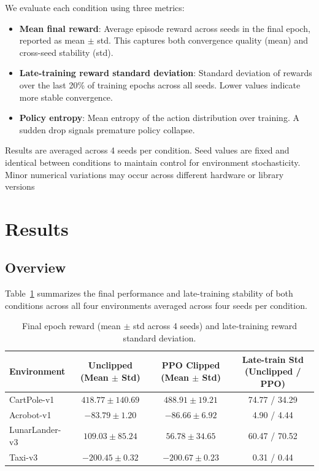 \documentclass{article}
\begin{document}
We evaluate each condition using three metrics:
\begin{itemize}
    \item \textbf{Mean final reward}: Average episode reward across seeds in the final epoch, reported as mean $\pm$ std. This captures both convergence quality (mean) and cross-seed stability (std).
    \item \textbf{Late-training reward standard deviation}: Standard deviation of rewards over the last 20\% of training epochs across all seeds. Lower values indicate more stable convergence.
    \item \textbf{Policy entropy}: Mean entropy of the action distribution over training. A sudden drop signals premature policy collapse.
\end{itemize}
Results are averaged across 4 seeds per condition. Seed values are fixed and identical between conditions to maintain control for environment stochasticity. Minor numerical variations may occur across different hardware or library versions

\section{Results}

\subsection{Overview}

Table~\ref{tab:results} summarizes the final performance and late-training stability of both conditions across all four environments averaged across four seeds per condition.

\begin{table}[h]
\caption{Final epoch reward (mean $\pm$ std across 4 seeds) and late-training reward standard deviation.}
\label{tab:results}
\begin{center}
\begin{tabular}{lccc}
\toprule
\textbf{Environment} & \textbf{Unclipped (Mean $\pm$ Std)} &
\textbf{PPO Clipped (Mean $\pm$ Std)} &
\textbf{Late-train Std (Unclipped / PPO)} \\
\midrule
CartPole-v1    & $418.77 \pm 140.69$ & $488.91 \pm 19.21$   & 74.77 / 34.29 \\
Acrobot-v1     & $-83.79 \pm 1.20$   & $-86.66 \pm 6.92$   & 4.90 / 4.44    \\
LunarLander-v3 & $109.03 \pm 85.24$   & $56.78 \pm 34.65$   & 60.47 / 70.52  \\
Taxi-v3        & $-200.45 \pm 0.32$  & $-200.67 \pm 0.23$ & 0.31 / 0.44   \\
\bottomrule
\end{tabular}
\end{center}
\end{table}
\end{document}

